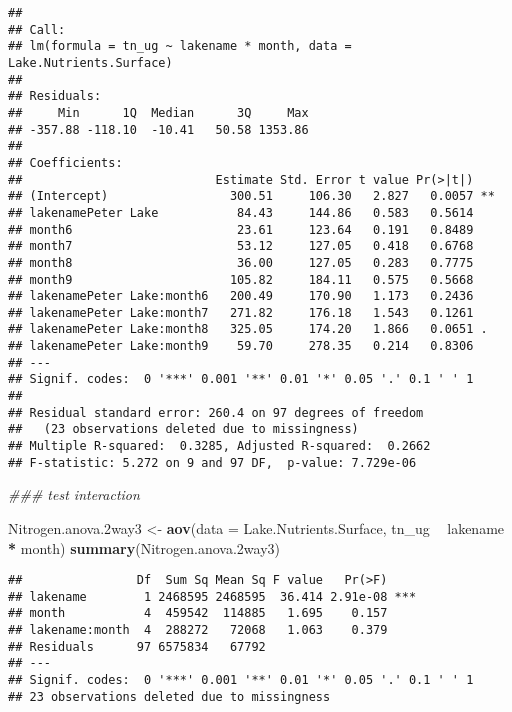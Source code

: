 \documentclass[]{article}
\newenvironment{Shaded}{\begin{snugshade}}{\end{snugshade}}
\newcommand{\CommentTok}[1]{\textcolor[rgb]{0.56,0.35,0.01}{\textit{#1}}}
\newcommand{\DataTypeTok}[1]{\textcolor[rgb]{0.13,0.29,0.53}{#1}}
\newcommand{\FloatTok}[1]{\textcolor[rgb]{0.00,0.00,0.81}{#1}}
\newcommand{\KeywordTok}[1]{\textcolor[rgb]{0.13,0.29,0.53}{\textbf{#1}}}
\newcommand{\NormalTok}[1]{#1}
\newcommand{\OperatorTok}[1]{\textcolor[rgb]{0.81,0.36,0.00}{\textbf{#1}}}
\newcommand{\StringTok}[1]{\textcolor[rgb]{0.31,0.60,0.02}{#1}}
\begin{document}
\begin{verbatim}
## 
## Call:
## lm(formula = tn_ug ~ lakename * month, data = Lake.Nutrients.Surface)
## 
## Residuals:
##     Min      1Q  Median      3Q     Max 
## -357.88 -118.10  -10.41   50.58 1353.86 
## 
## Coefficients:
##                           Estimate Std. Error t value Pr(>|t|)   
## (Intercept)                 300.51     106.30   2.827   0.0057 **
## lakenamePeter Lake           84.43     144.86   0.583   0.5614   
## month6                       23.61     123.64   0.191   0.8489   
## month7                       53.12     127.05   0.418   0.6768   
## month8                       36.00     127.05   0.283   0.7775   
## month9                      105.82     184.11   0.575   0.5668   
## lakenamePeter Lake:month6   200.49     170.90   1.173   0.2436   
## lakenamePeter Lake:month7   271.82     176.18   1.543   0.1261   
## lakenamePeter Lake:month8   325.05     174.20   1.866   0.0651 . 
## lakenamePeter Lake:month9    59.70     278.35   0.214   0.8306   
## ---
## Signif. codes:  0 '***' 0.001 '**' 0.01 '*' 0.05 '.' 0.1 ' ' 1
## 
## Residual standard error: 260.4 on 97 degrees of freedom
##   (23 observations deleted due to missingness)
## Multiple R-squared:  0.3285, Adjusted R-squared:  0.2662 
## F-statistic: 5.272 on 9 and 97 DF,  p-value: 7.729e-06
\end{verbatim}

\begin{Shaded}
\begin{Highlighting}[]
\CommentTok{### test interaction }

\NormalTok{Nitrogen.anova}\FloatTok{.2}\NormalTok{way3 <-}\StringTok{ }\KeywordTok{aov}\NormalTok{(}\DataTypeTok{data =}\NormalTok{ Lake.Nutrients.Surface, tn_ug }\OperatorTok{~}\StringTok{ }\NormalTok{lakename }\OperatorTok{*}\StringTok{ }\NormalTok{month)}
\KeywordTok{summary}\NormalTok{(Nitrogen.anova}\FloatTok{.2}\NormalTok{way3)}
\end{Highlighting}
\end{Shaded}

\begin{verbatim}
##                Df  Sum Sq Mean Sq F value   Pr(>F)    
## lakename        1 2468595 2468595  36.414 2.91e-08 ***
## month           4  459542  114885   1.695    0.157    
## lakename:month  4  288272   72068   1.063    0.379    
## Residuals      97 6575834   67792                     
## ---
## Signif. codes:  0 '***' 0.001 '**' 0.01 '*' 0.05 '.' 0.1 ' ' 1
## 23 observations deleted due to missingness
\end{verbatim}
\end{document}
